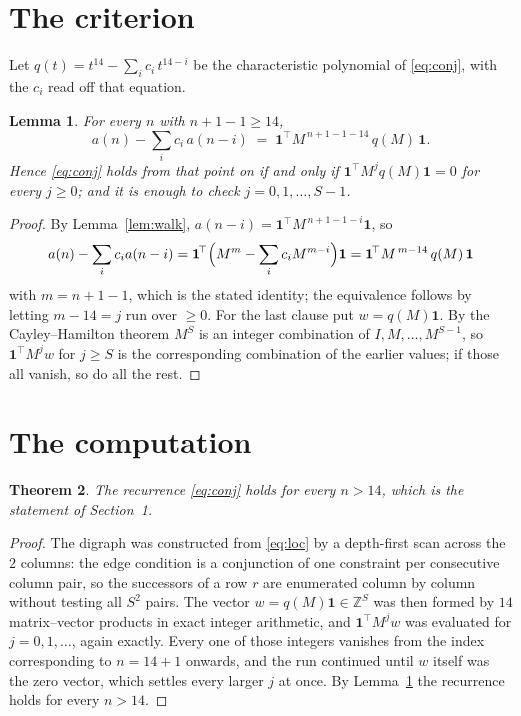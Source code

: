 \documentclass[11pt,a4paper]{article}
\theoremstyle{plain}
\newtheorem{theorem}{Theorem}
\newtheorem{lemma}[theorem]{Lemma}
\theoremstyle{definition}
\begin{document}
\section{The criterion}

Let $q(t)=t^{14}-\sum_i c_i\,t^{14-i}$ be the characteristic polynomial of
\eqref{eq:conj}, with the $c_i$ read off that equation.

\begin{lemma}\label{lem:crit}
For every $n$ with $n+1-1\ge14$,
\[
a(n)-\sum_i c_i\,a(n-i)\;=\;\mathbf{1}^{\!\top}M^{\,n+1-1-14}\,q(M)\,\mathbf{1} .
\]
Hence \eqref{eq:conj} holds from that point on if and only if
$\mathbf{1}^{\!\top}M^{j}q(M)\mathbf{1}=0$ for every $j\ge0$; and it is enough to check
$j=0,1,\dots,S-1$.
\end{lemma}

\begin{proof}
By Lemma~\ref{lem:walk}, $a(n-i)=\mathbf{1}^{\!\top}M^{\,n+1-1-i}\mathbf{1}$, so
\[
a(n)-\sum_i c_i a(n-i)
=\mathbf{1}^{\!\top}\Bigl(M^{m}-\sum_i c_i M^{m-i}\Bigr)\mathbf{1}
=\mathbf{1}^{\!\top}M^{\,m-14}\,q(M)\,\mathbf{1}
\]
with $m=n+1-1$, which is the stated identity; the equivalence follows by letting
$m-14=j$ run over $\ge0$. For the last clause put $w=q(M)\mathbf{1}$. By the
Cayley--Hamilton theorem $M^{S}$ is an integer combination of $I,M,\dots,M^{S-1}$, so
$\mathbf{1}^{\!\top}M^{j}w$ for $j\ge S$ is the corresponding combination of the earlier
values; if those all vanish, so do all the rest.
\end{proof}

\section{The computation}

\begin{theorem}
The recurrence \eqref{eq:conj} holds for every $n>14$, which is the statement of
Section~1.
\end{theorem}

\begin{proof}
The digraph was constructed from \eqref{eq:loc} by a depth-first scan across the $2$
columns: the edge condition is a conjunction of one constraint per consecutive column
pair, so the successors of a row $r$ are enumerated column by column without testing all
$S^2$ pairs. The vector $w=q(M)\mathbf{1}\in\mathbb{Z}^{S}$ was then formed by $14$
matrix--vector products in exact integer arithmetic, and $\mathbf{1}^{\!\top}M^{j}w$ was
evaluated for $j=0,1,\dots$, again exactly. Every one of those integers vanishes from the
index corresponding to $n=14+1$ onwards, and the run continued until $w$ itself was the
zero vector, which settles every larger $j$ at once. By Lemma~\ref{lem:crit} the recurrence
holds for every $n>14$.
\end{proof}
\end{document}
